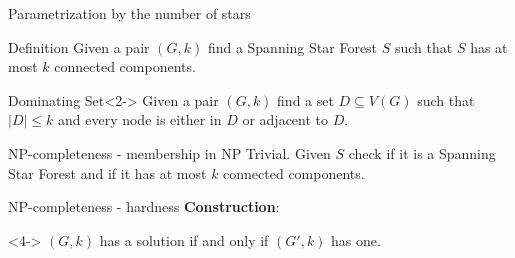 \documentclass{beamer}
\begin{document}
\begin{frame}{Parametrization by the number of stars}

\begin{block}{Definition}
	Given a pair $(G,k)$ find a Spanning Star Forest $S$ such that $S$ has at most $k$ connected components.
\end{block}

\bigskip

\begin{block}{Dominating Set}<2->
	Given a pair $(G,k)$ find a set $D \subseteq V(G)$ such that $|D| \leq k$ and every node is either in $D$ or adjacent to $D$.
\end{block}

\bigskip


\end{frame}

\begin{frame}{NP-completeness - membership in NP}
	Trivial. Given $S$ check if it is a Spanning Star Forest and if it has at most $k$ connected components.
\end{frame}

\begin{frame}{NP-completeness - hardness}
\textbf{Construction}:
\bigskip
{}

\begin{Lemma}<4->
	$(G,k)$ has a solution if and only if $(G',k)$ has one.
\end{Lemma}


\end{frame}
\end{document}
